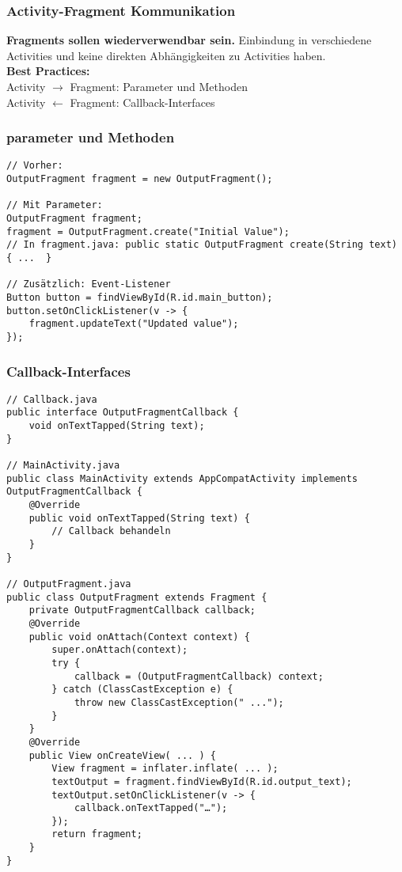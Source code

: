 \subsubsection{Activity-Fragment Kommunikation}
\textbf{Fragments sollen wiederverwendbar sein.} Einbindung in verschiedene Activities und keine direkten Abhängigkeiten zu Activities haben.\\
\textbf{Best Practices:}\\
Activity $\rightarrow$ Fragment: Parameter und Methoden\\
Activity $\leftarrow$ Fragment: Callback-Interfaces
\subsubsection{parameter und Methoden}
\begin{lstlisting}
// Vorher:
OutputFragment fragment = new OutputFragment();

// Mit Parameter:
OutputFragment fragment;
fragment = OutputFragment.create("Initial Value");
// In fragment.java: public static OutputFragment create(String text) { ...  }

// Zusätzlich: Event-Listener
Button button = findViewById(R.id.main_button);
button.setOnClickListener(v -> {
    fragment.updateText("Updated value");
});
\end{lstlisting}
\subsubsection{Callback-Interfaces}
\begin{lstlisting}
// Callback.java
public interface OutputFragmentCallback {
    void onTextTapped(String text);
}

// MainActivity.java
public class MainActivity extends AppCompatActivity implements OutputFragmentCallback {
    @Override
    public void onTextTapped(String text) {
        // Callback behandeln
    }
}

// OutputFragment.java
public class OutputFragment extends Fragment {
    private OutputFragmentCallback callback;
    @Override
    public void onAttach(Context context) {
        super.onAttach(context);
        try {
            callback = (OutputFragmentCallback) context;
        } catch (ClassCastException e) {
            throw new ClassCastException(" ...");
        }
    }
    @Override
    public View onCreateView( ... ) {
        View fragment = inflater.inflate( ... );
        textOutput = fragment.findViewById(R.id.output_text);
        textOutput.setOnClickListener(v -> {
            callback.onTextTapped("…");
        });
        return fragment;
    }
}
\end{lstlisting}
